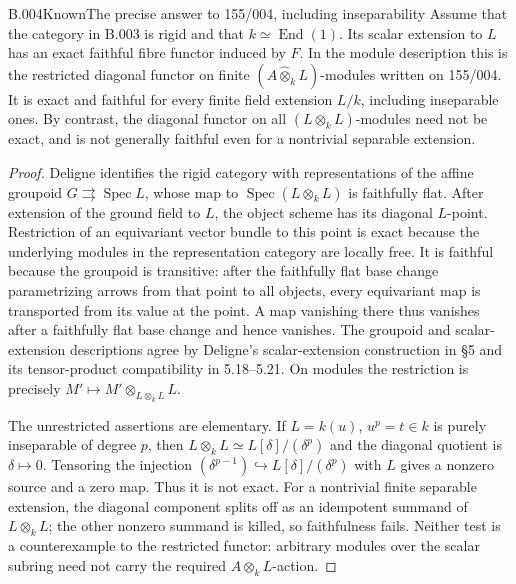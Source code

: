 \begin{saresult}{B.004}{Known}{The precise answer to 155/004, including inseparability}
Assume that the category in B.003 is rigid and that
$k\simeq\operatorname{End}(1)$. Its scalar extension to $L$ has an exact
faithful fibre functor induced by $F$. In the module description this
is the restricted diagonal functor on finite
$(A\widehat\otimes_k L)$-modules written on 155/004. It is exact and
faithful for every finite field extension $L/k$, including inseparable
ones. By contrast, the diagonal functor on all
$(L\otimes_k L)$-modules need not be exact, and is not generally
faithful even for a nontrivial separable extension.
\end{saresult}
\begin{proof}
Deligne \cite[Theorem 1.12, proved in 6.8 and 6.14--6.15]{Deligne1990}
identifies the rigid category with representations of the affine
groupoid $G\rightrightarrows\operatorname{Spec}L$, whose map to
$\operatorname{Spec}(L\otimes_k L)$ is faithfully flat. After extension
of the ground field to $L$, the object scheme has its diagonal
$L$-point. Restriction of an equivariant vector bundle to this point
is exact because the underlying modules in the representation
category are locally free. It is faithful because the groupoid is
transitive: after the faithfully flat base change parametrizing
arrows from that point to all objects, every equivariant map is
transported from its value at the point. A map vanishing there thus
vanishes after a faithfully flat base change and hence vanishes.
The groupoid and scalar-extension descriptions agree by Deligne's
scalar-extension construction in \S5 and its tensor-product
compatibility in 5.18--5.21. On modules the restriction is precisely
$M'\longmapsto M'\otimes_{L\otimes_k L}L$.

The unrestricted assertions are elementary. If
$L=k(u)$, $u^p=t\in k$ is purely inseparable of degree $p$, then
$L\otimes_k L\simeq L[\delta]/(\delta^p)$ and the diagonal quotient
is $\delta\mapsto0$. Tensoring the injection
$(\delta^{p-1})\hookrightarrow L[\delta]/(\delta^p)$ with $L$ gives
a nonzero source and a zero map. Thus it is not exact. For a nontrivial
finite separable extension, the diagonal component splits off as an
idempotent summand of $L\otimes_k L$; the other nonzero summand is
killed, so faithfulness fails. Neither test is a counterexample to
the restricted functor: arbitrary modules over the scalar subring
need not carry the required $A\otimes_k L$-action.
\end{proof}

